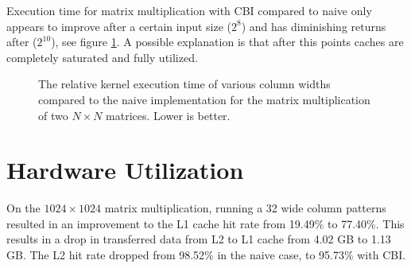 Execution time for matrix multiplication with CBI compared to naive only appears to improve after a certain input size ($2^8$) and has diminishing returns after ($2^10$), see figure \ref{fig:mm_naive_vs_cbi}.
A possible explanation is that after this points caches are completely saturated and fully utilized.

\begin{figure}[H]
    \centering
    \caption{
        The relative kernel execution time of various column widths compared to the naive implementation for the matrix multiplication of two $N \times N$ matrices. Lower is better.
    }
    \label{fig:mm_naive_vs_cbi}
\end{figure}

\section{Hardware Utilization}
On the $1024 \times 1024$ matrix multiplication, running a 32 wide column patterns resulted in an improvement to the L1 cache hit rate from 19.49\% to 77.40\%.
This results in a drop in transferred data from L2 to L1 cache from 4.02 GB to 1.13 GB. 
The L2 hit rate dropped from 98.52\% in the naive case, to 95.73\% with CBI.


